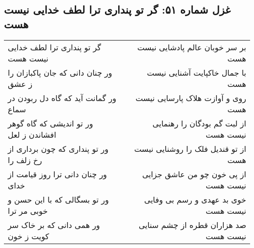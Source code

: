 \begin{center}
\section*{غزل شماره ۵۱: گر تو پنداری ترا لطف خدایی نیست هست}
\label{sec:051}
\begin{longtable}{l p{0.5cm} r}
گر تو پنداری ترا لطف خدایی نیست هست
&&
بر سر خوبان عالم پادشایی نیست هست
\\
ور چنان دانی که جان پاکبازان را ز عشق
&&
با جمال خاکپایت آشنایی نیست هست
\\
ور گمانت آید که گاه دل ربودن در سماع
&&
روی و آوازت هلاک پارسایی نیست هست
\\
ور تو اندیشی که گاه گوهر افشاندن ز لعل
&&
از لبت گم بودگان را رهنمایی نیست هست
\\
ور تو پنداری که چون برداری از رخ زلف را
&&
از تو قندیل فلک را روشنایی نیست هست
\\
ور چنان دانی ترا روز قیامت از خدای
&&
از پی خون چو من عاشق جزایی نیست هست
\\
ور تو بسگالی که با این حسن و خوبی مر ترا
&&
خوی بد عهدی و رسم بی وفایی نیست هست
\\
ور همی دانی که بر خاک سر کویت ز خون
&&
صد هزاران قطره از چشم سنایی نیست هست
\\
\end{longtable}
\end{center}

